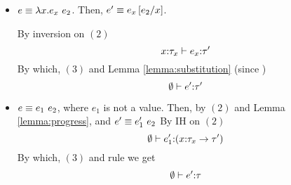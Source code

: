 \begin{itemize}
\begin{itemize}
\item $e \equiv \eapp{\efun{x}{e_x}}{e_2}$.
Then, $e' \equiv e_x\sub{x}{e_2}$.

By inversion on $(2)$
$$
	\hastype{x\colon\tau_x}{e_x}{\tau'}
$$
By which, $(3)$ and Lemma \ref{lemma:substitution} (since )
$$\hastype{\emptyset}{e'}{\tau'}$$

\item $e \equiv \eapp{e_1}{e_2}$, where $e_1$ is not a value.
Then, by $(2)$ and Lemma \ref{lemma:progress},  and 
$e'\equiv\eapp{e_1'}{e_2}$
By IH on $(2)$
$$	\hastype{\emptyset}{e_1'}{(\tfun{x}{\tau_{x}}{\tau'})}
$$
By which, $(3)$ and rule \rtapp we get
$$	\hastype{\emptyset}{e'}{\tau}$$
\end{itemize}
\end{itemize}
